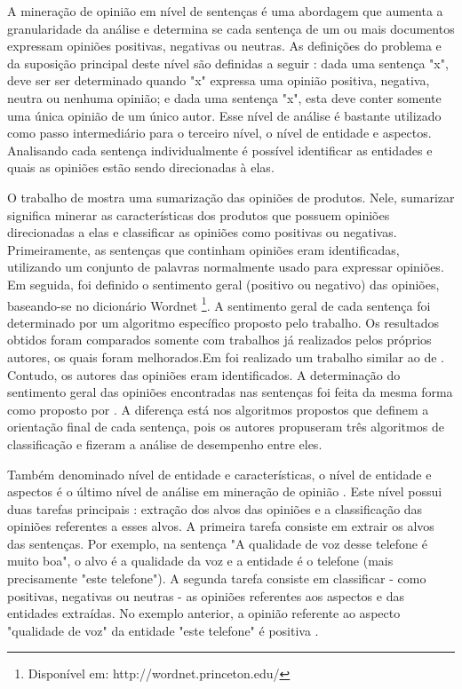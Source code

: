 \documentclass[template.tex]{subfiles}
\begin{document}
A mineração de opinião em nível de sentenças é uma abordagem que aumenta a granularidade da análise e determina se cada sentença de um ou mais documentos expressam opiniões positivas, negativas ou neutras. As definições do problema e da suposição principal deste nível são definidas a seguir \cite{bing:2012}: dada uma sentença "x", deve ser ser determinado quando "x" expressa uma opinião positiva, negativa, neutra ou nenhuma opinião; e dada uma sentença "x", esta deve conter somente uma única opinião de um único autor. Esse nível de análise é bastante utilizado como passo intermediário para o terceiro nível, o nível de entidade e aspectos. Analisando cada sentença individualmente é possível identificar as entidades e quais as opiniões estão sendo direcionadas à elas. 

O trabalho de  mostra uma sumarização das opiniões de produtos. Nele, sumarizar significa minerar as características dos produtos que possuem opiniões direcionadas a elas e classificar as opiniões como positivas ou negativas. Primeiramente, as sentenças que continham opiniões eram identificadas, utilizando um conjunto de palavras normalmente usado para expressar opiniões. Em seguida, foi definido o sentimento geral (positivo ou negativo) das opiniões, baseando-se no dicionário Wordnet \footnote{Disponível em: http://wordnet.princeton.edu/}. A sentimento geral de cada sentença foi determinado por um algoritmo específico proposto pelo trabalho. Os resultados obtidos foram comparados somente com trabalhos já realizados pelos próprios autores, os quais foram melhorados.Em  foi realizado um trabalho similar ao de . Contudo, os autores das opiniões eram identificados.  A determinação do sentimento geral das opiniões encontradas nas sentenças foi feita da mesma forma como proposto por . A diferença está nos algoritmos propostos que definem a orientação final de cada sentença, pois os autores propuseram três algoritmos de classificação e fizeram a análise de desempenho entre eles.

Também denominado nível de entidade e características, o nível de entidade e aspectos é o último nível de análise em mineração de opinião \cite{bing:2012}. Este nível possui duas tarefas principais \cite{bing:2012}: extração dos alvos das opiniões e a classificação das opiniões referentes a esses alvos. A primeira tarefa consiste em extrair os alvos das sentenças. Por exemplo, na sentença "A qualidade de voz desse telefone é muito boa", o alvo é a qualidade da voz e a entidade é o telefone (mais precisamente "este telefone"). A segunda tarefa consiste em classificar - como positivas, negativas ou neutras - as opiniões referentes aos aspectos e das entidades extraídas. No exemplo anterior, a opinião referente ao aspecto "qualidade de voz" da entidade "este telefone" é positiva \cite{bing:2012}.
\end{document}
